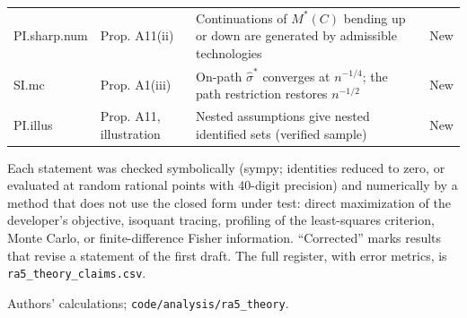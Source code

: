 \begin{table}[tp]
\begin{tabular}{@{}l >{\raggedright\arraybackslash}p{} >{\raggedright\arraybackslash}p{} l@{}}
PI.sharp.num & Prop. A11(ii) & Continuations of $M^*(C)$ bending up or down are generated by admissible technologies & New \\
SI.mc & Prop. A1(iii) & On-path $\hat\sigma^*$ converges at $n^{-1/4}$; the path restriction restores $n^{-1/2}$ & New \\
PI.illus & Prop. A11, illustration & Nested assumptions give nested identified sets (verified sample) & New \\
\bottomrule
\end{tabular}
\par\smallskip
\begin{tablenotes}Each statement was checked symbolically (sympy; identities reduced to zero, or evaluated at random rational points with 40-digit precision) and numerically by a method that does not use the closed form under test: direct maximization of the developer's objective, isoquant tracing, profiling of the least-squares criterion, Monte Carlo, or finite-difference Fisher information. ``Corrected'' marks results that revise a statement of the first draft. The full register, with error metrics, is \texttt{ra5\_theory\_claims.csv}.\end{tablenotes}
\begin{tablenotes}[Source]Authors' calculations; \texttt{code/analysis/ra5\_theory}.\end{tablenotes}
\end{table}
